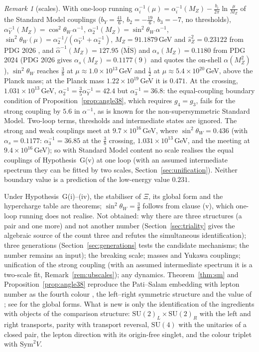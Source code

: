 \documentclass[aps,pra,onecolumn,superscriptaddress,nofootinbib,10pt]{revtex4-2}
\theoremstyle{definition}
\theoremstyle{remark}
\newtheorem{remark}[theorem]{Remark}
\newcommand{\SU}{\mathrm{SU}}
\begin{document}
\begin{remark}[scales]\label{rem:scales}
With one-loop running $\alpha_i^{-1}(\mu)=\alpha_i^{-1}(M_Z)-\frac{b_i}{2\pi}\ln\frac\mu{M_Z}$ of the Standard
Model couplings ($b_Y=\tfrac{41}6$, $b_2=-\tfrac{19}6$, $b_3=-7$, no thresholds),
$\alpha_Y^{-1}(M_Z)=\cos^2\theta_W\,\alpha^{-1}$, $\alpha_2^{-1}(M_Z)=\sin^2\theta_W\,\alpha^{-1}$,
$\sin^2\theta_W(\mu)=\alpha_2^{-1}/(\alpha_Y^{-1}+\alpha_2^{-1})$, $M_Z=91.1879$\,GeV and $\hat s_Z^2=0.23122$ from PDG 2026 \cite{ex-PDG26}, and $\hat\alpha^{-1}(M_Z)=127.95$ ($\overline{\mathrm{MS}}$)
and $\alpha_s(M_Z)=0.1180$ from PDG 2024 \cite{PDG} (PDG 2026 gives $\alpha_s(M_Z)=0.1177(9)$ and quotes the
on-shell $\alpha(M_Z^2)$), $\sin^2\theta_W$ reaches $\tfrac38$ at
$\mu\approx1.0\times10^{13}$\,GeV and $\tfrac12$ at $\mu\approx5.4\times10^{20}$\,GeV, above the Planck
mass; at the Planck mass $1.22\times10^{19}$\,GeV it is $0.471$.  At the crossing, $1.031\times10^{13}$\,GeV, $\alpha_2^{-1}=\tfrac35\alpha_Y^{-1}=42.4$ but
$\alpha_3^{-1}=36.8$: the equal-coupling boundary condition of Proposition~\ref{prop:angle38}, which
requires $g_4=g_3$, fails for the strong coupling by $5.6$ in $\alpha^{-1}$, as is known for the
non-supersymmetric Standard Model.  Two-loop terms, thresholds and intermediate states are ignored.
The strong and weak couplings meet at $9.7\times10^{16}$\,GeV, where $\sin^2\theta_W=0.436$ (with
$\alpha_s=0.1177$: $\alpha_3^{-1}=36.85$ at the $\tfrac38$ crossing, $1.031\times10^{13}$\,GeV, and the meeting at $9.4\times10^{16}$\,GeV); so with
Standard Model content no scale realises the equal couplings of Hypothesis~G(v) at one loop
(with an assumed intermediate spectrum they can be fitted by two scales, Section~\ref{sec:unification}).  Neither
boundary value is a prediction of the low-energy value $0.231$.
\end{remark}

\smallskip
Under Hypothesis~G(i)--(iv), the stabiliser of $\Xi$, its global form and the hypercharge table are
theorems; $\sin^2\theta_W=\tfrac38$ follows from clause (v), which one-loop running does not realise.  Not obtained: why there are
three structures (a pair and one more) and not another number (Section~\ref{sec:triality} gives the
algebraic source of the count three and refutes the simultaneous identification); three generations (Section~\ref{sec:generations} tests the candidate
mechanisms; the number remains an input); the breaking
scale; masses and Yukawa couplings; unification of the strong coupling (with an assumed intermediate
spectrum it is a two-scale fit, Remark~\ref{rem:ubscales}); any dynamics.
Theorem~\ref{thm:sm} and Proposition~\ref{prop:angle38} reproduce the Pati--Salam embedding with
lepton number as the fourth colour \cite{PatiSalam}, the left--right symmetric structure
\cite{MohapatraPati,SenjanovicMohapatra} and the value of \cite{GQW}; see \cite{BaezHuerta} for the
global forms.  What is new is only the identification of the ingredients with objects of the
comparison structure: $\SU(2)_L\times\SU(2)_R$ with the left and right transports, parity with
transport reversal, $\SU(4)$ with the unitaries of a closed pair, the lepton direction with its
origin-free singlet, and the colour triplet with $\mathrm{Sym}^2V$.
\end{document}
